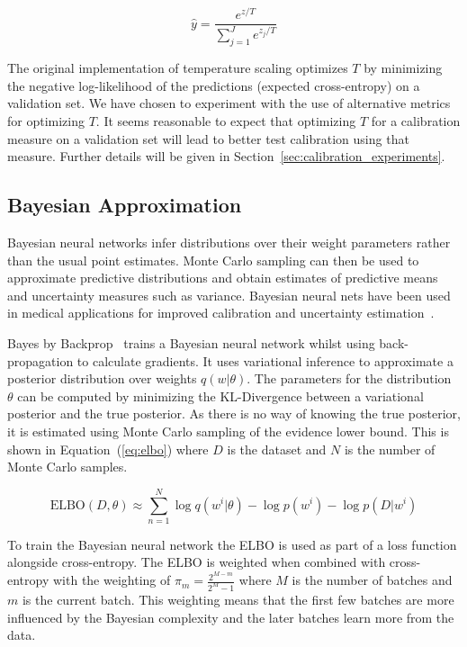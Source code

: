 \begin{equation}
	\hat{y} = \frac{e^{z/T}}{\sum^{J}_{j=1}e^{z_j/T}}
	\label{eq:temperature_scaling}
\end{equation}

The original implementation of temperature scaling optimizes $T$ by minimizing the negative log-likelihood of the predictions (expected cross-entropy) on a validation set. We have chosen to experiment with the use of alternative metrics for optimizing $T$. It seems reasonable to expect that optimizing $T$ for a calibration measure on a validation set will lead to better test calibration using that measure. Further details will be given in Section~\ref{sec:calibration_experiments}.


\subsection{Bayesian Approximation}
Bayesian neural networks infer distributions over their weight parameters rather than the usual point estimates. Monte Carlo sampling can then be used to approximate predictive distributions and obtain estimates of predictive means and uncertainty measures such as variance. Bayesian neural nets have been used in medical applications for improved calibration and uncertainty estimation~\citep{kwon2020uncertainty}.

Bayes by Backprop~\citep{blundell2015weight} trains a Bayesian neural network whilst using back-propagation to calculate gradients. It uses variational inference to approximate a posterior distribution over weights $q(w|\theta)$. The parameters for the distribution $\theta$ can be computed by minimizing the KL-Divergence between a variational posterior and the true posterior. As there is no way of knowing the true posterior, it is estimated using Monte Carlo sampling of the evidence lower bound. This is shown in Equation~(\ref{eq:elbo}) where $D$ is the dataset and $N$ is the number of Monte Carlo samples.

\begin{equation}
	\text{ELBO}(D, \theta) \approx \sum^N_{n=1}\log q(w^i|\theta)-\log p(w^i) - \log p(D|w^i)
	\label{eq:elbo}
\end{equation}

To train the Bayesian neural network the ELBO is used as part of a loss function alongside cross-entropy. The ELBO is weighted when combined with cross-entropy with the weighting of $\pi_m = \frac{2^{M-m}}{2^M-1}$ where $M$ is the number of batches and $m$ is the current batch. This weighting means that the first few batches are more influenced by the Bayesian complexity and the later batches learn more from the data. 

